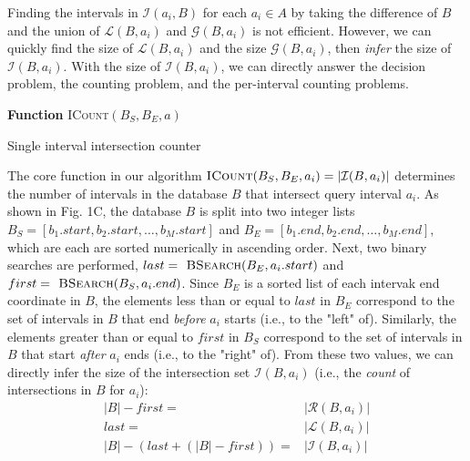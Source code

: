 \documentclass{bioinfo}
\begin{document}
	Finding the intervals in $\mathcal{I}(a_i,B)$ for each $a_i\in A$ by
	taking the difference of $B$ and the union of $\mathcal{L}(B,a_i)$ and
	$\mathcal{G}(B,a_i)$ is not efficient.  However, we can quickly find
	the size of $\mathcal{L}(B,a_i)$ and the size $\mathcal{G}(B,a_i)$,
	then \emph{infer} the size of $\mathcal{I}(B,a_i)$.  With the size of
	$\mathcal{I}(B,a_i)$, we can directly answer the decision problem, the
	counting problem, and the per-interval counting problems.

	\begin{algorithm}[h]
		\DontPrintSemicolon
		\footnotesize
		\BlankLine
		\textbf{Function} \textsc{ICount}$(B_S,B_E,a)$
		\caption{Single interval intersection counter}
	\end{algorithm}

	The core function in our algorithm 
	$\textsc{ICount}(B_S,B_E,a_i) = |\mathcal{I}(B,a_i)|$ determines the number of
	intervals in the database $B$ that intersect query interval $a_i$.  As shown in
	Fig. 1C, the database $B$ is split into two integer lists 
	$B_S = [b_1.start, b_2.start, \dots, b_M.start]$ and 
	$B_E = [b_1.end, b_2.end, \dots, b_M.end]$, which are each are sorted  
	numerically in ascending order.  Next, two binary searches are performed,
	$last=\textsc{ BSearch}(B_E, a_i.start)$ and 
	$first=\textsc{ BSearch}(B_S, a_i.end)$.  Since $B_E$ is a sorted list of each
	intervak end coordinate in $B$, the elements
	less than or equal to $last$ in $B_E$ correspond to the set of intervals in $B$
	that end \emph{before} $a_i$ starts (i.e., to the "left" of).
	Similarly, the elements greater than or equal to $first$ in $B_S$ correspond to the
	set of intervals in $B$ that start \emph{after} $a_i$ ends 
	(i.e., to the "right" of).  From these two values, 
	we can directly infer the size of the intersection set $\mathcal{I}(B,a_i)$ 
	(i.e., the \emph{count} of intersections in $B$ for $a_i$):
	\begin{equation*}
		\begin{split}
			|B|-first=&|\mathcal{R}(B,a_i)| \\
			last=&|\mathcal{L}(B,a_i)| \\ 
			|B|-(last+(|B|-first))=&|\mathcal{I}(B,a_i)|
		\end{split}
	\end{equation*}
\end{document}
